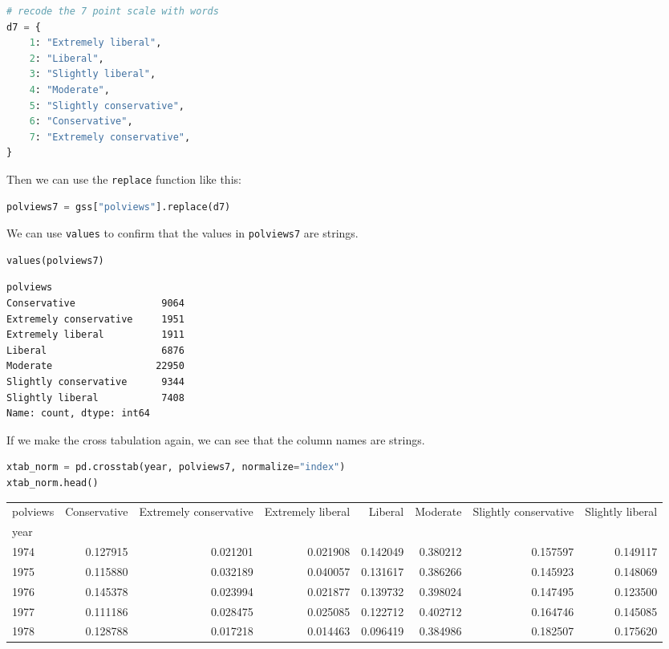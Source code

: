 \begin{lstlisting}[language=Python,style=source]
# recode the 7 point scale with words
d7 = {
    1: "Extremely liberal",
    2: "Liberal",
    3: "Slightly liberal",
    4: "Moderate",
    5: "Slightly conservative",
    6: "Conservative",
    7: "Extremely conservative",
}
\end{lstlisting}

Then we can use the \passthrough{\lstinline!replace!} function like
this:

\begin{lstlisting}[language=Python,style=source]
polviews7 = gss["polviews"].replace(d7)
\end{lstlisting}

We can use \passthrough{\lstinline!values!} to confirm that the values
in \passthrough{\lstinline!polviews7!} are strings.

\begin{lstlisting}[language=Python,style=source]
values(polviews7)
\end{lstlisting}

\begin{lstlisting}[style=output]
polviews
Conservative               9064
Extremely conservative     1951
Extremely liberal          1911
Liberal                    6876
Moderate                  22950
Slightly conservative      9344
Slightly liberal           7408
Name: count, dtype: int64
\end{lstlisting}

If we make the cross tabulation again, we can see that the column names
are strings.

\begin{lstlisting}[language=Python,style=source]
xtab_norm = pd.crosstab(year, polviews7, normalize="index")
xtab_norm.head()
\end{lstlisting}

\begin{tabular}{lrrrrrrr}
\midrule
polviews & Conservative & Extremely conservative & Extremely liberal & Liberal & Moderate & Slightly conservative & Slightly liberal \\
year &  &  &  &  &  &  &  \\
\midrule
1974 & 0.127915 & 0.021201 & 0.021908 & 0.142049 & 0.380212 & 0.157597 & 0.149117 \\
1975 & 0.115880 & 0.032189 & 0.040057 & 0.131617 & 0.386266 & 0.145923 & 0.148069 \\
1976 & 0.145378 & 0.023994 & 0.021877 & 0.139732 & 0.398024 & 0.147495 & 0.123500 \\
1977 & 0.111186 & 0.028475 & 0.025085 & 0.122712 & 0.402712 & 0.164746 & 0.145085 \\
1978 & 0.128788 & 0.017218 & 0.014463 & 0.096419 & 0.384986 & 0.182507 & 0.175620 \\
\midrule
\end{tabular}

